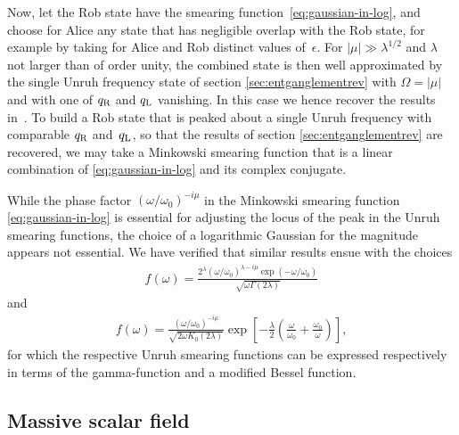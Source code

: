 Now, let the Rob state have the smearing
function~\eqref{eq:gaussian-in-log}, and choose for Alice any state
that has negligible overlap with the Rob state, for example by taking
for Alice and Rob distinct values of~$\epsilon$. For $|\mu| \gg
\lambda^{1/2}$ and $\lambda$ not larger than of order unity, the
combined state is then well approximated by the single Unruh frequency
state of section \ref{sec:entganglementrev}
with $\Omega=|\mu|$ and with one of $q_\text{\text{R}}$ and
$q_\text{\text{L}}$ vanishing. In this case we hence recover the 
results in~\cite{Alicefalls}. 
To build a Rob state that is 
peaked about a single Unruh frequency with 
comparable $q_\text{\text{R}}$ and~$q_\text{\text{L}}$, 
so that the results of section 
\ref{sec:entganglementrev} are recovered, we may take 
a Minkowski smearing function that
is a linear combination of \eqref{eq:gaussian-in-log} and its complex
conjugate.

While the phase factor ${(\omega/\omega_0)}^{-i\mu}$ in the Minkowski
smearing function \eqref{eq:gaussian-in-log} is essential for
adjusting the locus of the peak in the Unruh smearing functions,
the choice of a logarithmic Gaussian for the magnitude appears not
essential. We have verified that similar results ensue with the
choices 
\begin{align}
f(\omega) = 
\frac{2^{\lambda}
{(\omega/\omega_0)}^{\lambda-i\mu} \exp(-\omega/\omega_0)}
{\sqrt{\omega\Gamma(2\lambda)}}
\end{align}
and 
\begin{align}
f(\omega) = 
\frac{{(\omega/\omega_0)}^{-i\mu}}{\sqrt{2\omega K_0(2\lambda)}}
\exp
\left[- \frac{\lambda}{2} 
\left(\frac{\omega}{\omega_0}+ \frac{\omega_0}{\omega}\right)
\right], 
\end{align}
for which the respective Unruh smearing functions can be expressed respectively in terms of
the gamma-function and a modified Bessel function. 

\subsection{Massive scalar field\label{subsec:massivescalar}}

